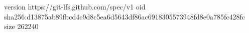 version https://git-lfs.github.com/spec/v1
oid sha256:d13875ab89fbcd4e9d8c5ea6d5643df86ac6918305573948fd8e0a785fc428fc
size 262240
